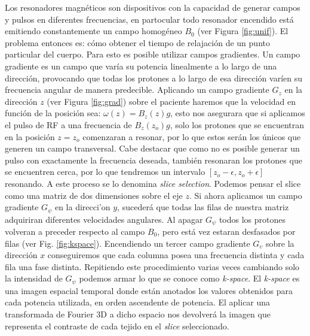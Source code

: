 \vspace{0.1cm}

Los resonadores magn\'eticos son dispositivos con la capacidad de generar 
campos y pulsos en diferentes frecuencias, en partocular todo resonador encendido
est\'a emitiendo constantemente un campo homog\'eneo $B_0$ (ver Figura \ref{fig:unif}). 
El problema entonces es: c\'omo obtener el tiempo de relajaci\'on 
de un punto particular del cuerpo. Para esto es posible utilizar campos 
gradientes. Un campo gradiente es un campo que var\'ia su potencia linealmente
a lo largo de una direcci\'on, provocando que todas los protones a lo 
largo de esa direcci\'on var\'ien su frecuencia angular de manera predecible. 
Aplicando un campo gradiente $G_z$ en la direcci\'on $z$ (ver Figura \ref{fig:grad})
sobre el paciente haremos que la velocidad en funci\'on de la posici\'on sea:
$\omega(z) = B_z(z) g$, esto nos asegurara que si aplicamos el pulso de RF a una
frecuencia de $B_z(z_o) g$, solo los protones que se encuentran en la posici\'on
$z=z_o$ comenzaran a resonar, por lo que estos ser\'an los \'unicos que generen un 
campo transversal. Cabe destacar que como no es posible generar un pulso con
exactamente la frecuencia deseada, tambi\'en resonaran los protones que se 
encuentren cerca, por lo que tendremos un intervalo $[z_o-\epsilon,z_o+\epsilon]$
resonando. A este proceso se lo denomina \textit{slice selection}. Podemos pensar 
el slice como una matriz de dos dimensiones sobre el eje $z$. Si ahora aplicamos
un campo gradiente $G_\psi$ en la direcci'on $y$, suceder\'a que todas las 
filas de nuestra matriz adquiriran diferentes velocidades angulares. Al apagar
$G_\psi$ todos los protones volveran a preceder respecto al campo $B_0$, pero
est\'a vez estaran desfasados por filas (ver Fig. \ref{fig:kspace}). Encendiendo
un tercer campo gradiente $G_\upsilon$ sobre la direcci\'on $x$ conseguiremos
que cada columna posea una frecuencia distinta y cada fila una fase distinta.
Repitiendo este procedimiento varias veces cambiando solo la intensidad de
$G_\psi$ podemos armar lo que se conoce como \textit{k-space}. El \textit{k-space}
es una imagen espacial temporal donde est\'an anotados los valores obtenidos para
cada potencia utilizada, en orden ascendente de potencia. El aplicar una
transformada de Fourier 3D a dicho espacio nos devolver\'a la imagen que
representa el contraste de cada tejido en el \textit{slice} seleccionado. \\

